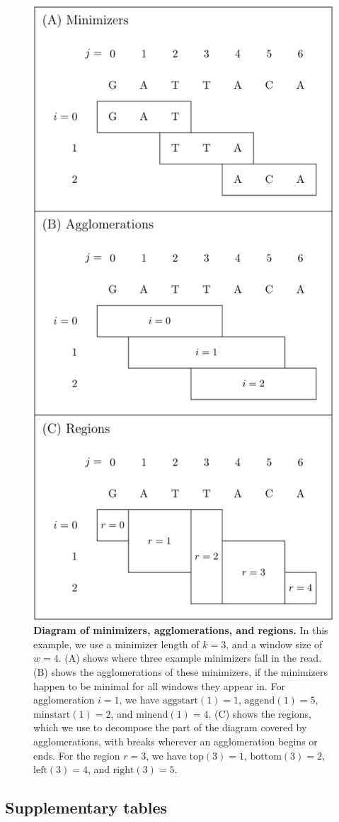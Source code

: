 \documentclass[11pt]{ucscthesis}
\newcommand{\rtop}[1]{\mathrm{top}(#1)}
\newcommand{\rbottom}[1]{\mathrm{bottom}(#1)}
\newcommand{\rleft}[1]{\mathrm{left}(#1)}
\newcommand{\rright}[1]{\mathrm{right}(#1)}
\newcommand{\minstart}[1]{\mathrm{minstart}(#1)}
\newcommand{\minend}[1]{\mathrm{minend}(#1)}
\newcommand{\aggstart}[1]{\mathrm{aggstart}(#1)}
\newcommand{\aggend}[1]{\mathrm{aggend}(#1)}
\newcommand{\faDownload}{X}
\newcommand{\indexurl}[1]{\href{#1}{\faDownload}}
\begin{document}
\begin{figure}[H]
    \includegraphics[width=.5\linewidth]{aim2_supplement_regiondiagram.pdf}
    \caption[Diagram of minimizers, agglomerations, and regions]{{\bf Diagram of minimizers, agglomerations, and regions.} In this example, we use a minimizer length of $k=3$, and a window size of $w=4$. (A) shows where three example minimizers fall in the read. (B) shows the agglomerations of these minimizers, if the minimizers happen to be minimal for all windows they appear in. For agglomeration $i=1$, we have $\aggstart{1}=1$, $\aggend{1}=5$, $\minstart{1}=2$, and $\minend{1}=4$. (C) shows the regions, which we use to decompose the part of the diagram covered by agglomerations, with breaks wherever an agglomeration begins or ends. For the region $r=3$, we have $\rtop{3}=1$, $\rbottom{3}=2$, $\rleft{3}=4$, and $\rright{3}=5$.
  }
  \label{fig:aim2_supplement_regions}
\end{figure}

\subsection{Supplementary tables}


\newcommand{\mapindexes}[1]{\indexurl{#1.xg} & \indexurl{#1.gcsa} & \indexurl{#1.gcsa.lcp} & & & &}
\newcommand{\giraffeindexes}[1]{\indexurl{#1.xg} & & & \indexurl{#1.gbwt} & \indexurl{#1.min} & \indexurl{#1.gg} & \indexurl{#1.dist}}
\end{document}
